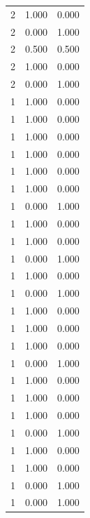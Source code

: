 \begin{tabular}{rrr}
2 & 1.000 & 0.000 \\
2 & 0.000 & 1.000 \\
2 & 0.500 & 0.500 \\
2 & 1.000 & 0.000 \\
2 & 0.000 & 1.000 \\
1 & 1.000 & 0.000 \\
1 & 1.000 & 0.000 \\
1 & 1.000 & 0.000 \\
1 & 1.000 & 0.000 \\
1 & 1.000 & 0.000 \\
1 & 1.000 & 0.000 \\
1 & 0.000 & 1.000 \\
1 & 1.000 & 0.000 \\
1 & 1.000 & 0.000 \\
1 & 0.000 & 1.000 \\
1 & 1.000 & 0.000 \\
1 & 0.000 & 1.000 \\
1 & 1.000 & 0.000 \\
1 & 1.000 & 0.000 \\
1 & 1.000 & 0.000 \\
1 & 0.000 & 1.000 \\
1 & 1.000 & 0.000 \\
1 & 1.000 & 0.000 \\
1 & 1.000 & 0.000 \\
1 & 0.000 & 1.000 \\
1 & 1.000 & 0.000 \\
1 & 1.000 & 0.000 \\
1 & 0.000 & 1.000 \\
1 & 0.000 & 1.000 \\
\bottomrule
\end{tabular}
